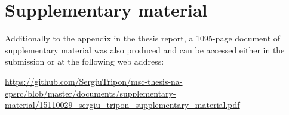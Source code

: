 \chapter{Supplementary material}
\label{appendix:supplementary_material}

Additionally to the appendix in the thesis report, a 1095-page document of supplementary material was also produced and can be accessed either in the submission or at the following web address:

\url{https://github.com/SergiuTripon/msc-thesis-na-epsrc/blob/master/documents/supplementary-material/15110029_sergiu_tripon_supplementary_material.pdf}
